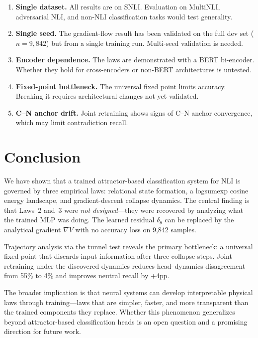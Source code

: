 \documentclass[11pt]{article}
\begin{document}
\begin{enumerate}
    \item \textbf{Single dataset.} All results are on SNLI. Evaluation
          on MultiNLI, adversarial NLI, and non-NLI classification tasks
          would test generality.
    \item \textbf{Single seed.} The gradient-flow result has been
          validated on the full dev set ($n=9{,}842$) but from a single
          training run. Multi-seed validation is needed.
    \item \textbf{Encoder dependence.} The laws are demonstrated with a
          BERT bi-encoder. Whether they hold for cross-encoders or
          non-BERT architectures is untested.
    \item \textbf{Fixed-point bottleneck.} The universal fixed point
          limits accuracy. Breaking it requires architectural changes
          not yet validated.
    \item \textbf{C--N anchor drift.} Joint retraining shows signs of
          C--N anchor convergence, which may limit contradiction recall.
\end{enumerate}

\section{Conclusion}
\label{sec:conclusion}

We have shown that a trained attractor-based classification system
for NLI is governed by three empirical laws: relational state formation,
a logsumexp cosine energy landscape, and gradient-descent collapse
dynamics. The central finding is that Laws~2 and~3 were \emph{not
designed}---they were recovered by analyzing what the trained MLP was
doing. The learned residual $\delta_\theta$ can be replaced by the
analytical gradient $\nabla V$ with no accuracy loss on 9,842 samples.

Trajectory analysis via the tunnel test reveals the primary bottleneck:
a universal fixed point that discards input information after three
collapse steps. Joint retraining under the discovered dynamics reduces
head--dynamics disagreement from 55\% to 4\% and improves neutral
recall by +4pp.

The broader implication is that neural systems can develop interpretable
physical laws through training---laws that are simpler, faster, and more
transparent than the trained components they replace. Whether this
phenomenon generalizes beyond attractor-based classification heads is
an open question and a promising direction for future work.
\end{document}
